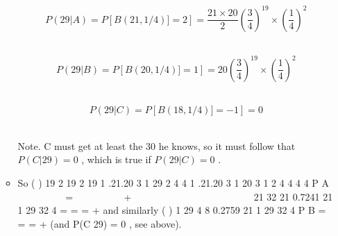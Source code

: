 \documentclass[a4paper,12pt]{article}
\begin{document}
\begin{enumerate}[(a)]
\begin{itemize}
\[ P(29|A) =  P \left[ B(21,1/4)] = 2  \right]  = \frac{21 \times 20}{2} \left(  \frac{3}{4}\right)^{19} \times \left(  \frac{1}{4}\right)^2\] 

\[ P(29|B) =  P \left[ B(20,1/4)] = 1  \right]  = 20 \left(  \frac{3}{4}\right)^{19} \times \left(  \frac{1}{4}\right)^2\]      

\[ P(29|C) =  P \left[ B(18,1/4)] = -1  \right]  = 0 \]   

Note. C must get at least the 30 he knows, so it must follow that
  $P(C| 29) = 0$ , which is true if $P(29|C) = 0$ .


\item  
So ( )
19 2
19 2 19
1 .21.20 3 1
29 2 4 4
1 .21.20 3 1 20 3 1
2 4 4 4 4
P A
   
   
=    
    +            
       
21
32 21 0.7241 21 1 29
32 4
= = =
  +
  and similarly
( )
1
29 4 8 0.2759 21 1 29
32 4
P B = = =
  +
  (and P(C 29) = 0 , see above).
\end{itemize}

\end{enumerate}
\end{document}

